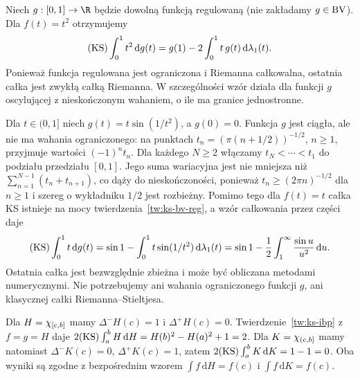 \begin{przyklad}
Niech $g:[0,1]\to\R$ będzie dowolną funkcją regulowaną (nie zakładamy $g\in\mathrm{BV}$). Dla $f(t)=t^2$ otrzymujemy
\[
 (\mathrm{KS})\int_0^1 t^2\,\mathrm dg(t)=g(1)-2\int_0^1 t\,g(t)\,\mathrm d\lambda_1(t).
\]
Ponieważ funkcja regulowana jest ograniczona i Riemanna całkowalna, ostatnia całka jest zwykłą całką Riemanna. W szczególności wzór działa dla funkcji $g$ oscylującej z nieskończonym wahaniem, o ile ma granice jednostronne.
\end{przyklad}

\begin{przyklad}
Dla $t\in(0,1]$ niech $g(t)=t\sin(1/t^2)$, a $g(0)=0$. Funkcja $g$ jest ciągła, ale nie ma wahania ograniczonego: na punktach $t_n=(\pi(n+1/2))^{-1/2}$, $n\ge1$, przyjmuje wartości $(-1)^nt_n$. Dla każdego $N\ge2$ włączamy $t_N<\cdots<t_1$ do podziału przedziału $[0,1]$. Jego suma wariacyjna jest nie mniejsza niż $\sum_{n=1}^{N-1}(t_n+t_{n+1})$, co dąży do nieskończoności, ponieważ $t_n\ge (2\pi n)^{-1/2}$ dla $n\ge1$ i szereg o wykładniku $1/2$ jest rozbieżny. Pomimo tego dla $f(t)=t$ całka KS istnieje na mocy twierdzenia~\ref{tw:ks-bv-reg}, a wzór całkowania przez części daje
\[
 (\mathrm{KS})\int_0^1 t\,\mathrm dg(t)
 =\sin1-\int_0^1 t\sin(1/t^2)\,\mathrm d\lambda_1(t)
 =\sin1-\frac12\int_1^\infty\frac{\sin u}{u^2}\,\mathrm du.
\]
Ostatnia całka jest bezwzględnie zbieżna i może być obliczana metodami numerycznymi. Nie potrzebujemy ani wahania ograniczonego funkcji $g$, ani klasycznej całki Riemanna--Stieltjesa.
\end{przyklad}

\begin{przyklad}
Dla $H=\chi_{[c,b]}$ mamy $\Delta^-H(c)=1$ i $\Delta^+H(c)=0$. Twierdzenie~\ref{tw:ks-ibp} z $f=g=H$ daje
$2(\mathrm{KS})\int_a^b H\,\mathrm dH=H(b)^2-H(a)^2+1=2$. Dla $K=\chi_{(c,b]}$ mamy natomiast $\Delta^-K(c)=0$, $\Delta^+K(c)=1$, zatem $2(\mathrm{KS})\int_a^b K\,\mathrm dK=1-1=0$. Oba wyniki są zgodne z bezpośrednim wzorem $\int f\,\mathrm dH=f(c)$ i $\int f\,\mathrm dK=f(c)$.
\end{przyklad}

